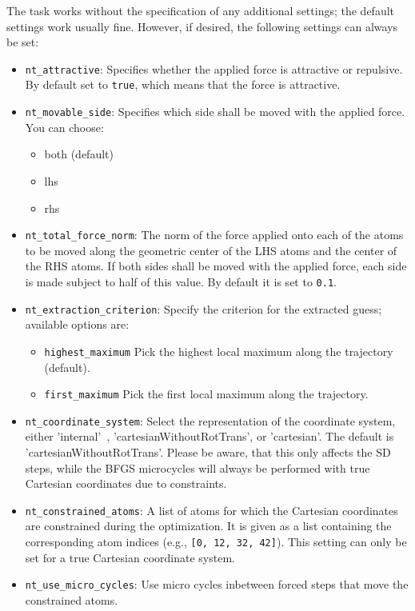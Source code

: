 \documentclass[]{tufte-book}
\begin{document}
The task works without the specification of any additional settings; the default settings work usually fine. However,
if desired, the following settings can always be set:
\begin{itemize}
\item \texttt{nt\_attractive}: Specifies whether the applied force is attractive or repulsive. By default set to
\texttt{true}, which means that the force is attractive.
\item \texttt{nt\_movable\_side}: Specifies which side shall be moved with the applied force. You can choose:
\begin{itemize}
\item both (default)
\item lhs
\item rhs
\end{itemize}
\item \texttt{nt\_total\_force\_norm}: The norm of the force applied onto each of the atoms to be moved along the geometric center of the LHS atoms and the center of the RHS atoms.
If both sides shall be moved with the applied force, each side is made subject to half of this value.
By default it is set to \texttt{0.1}.
\item \texttt{nt\_extraction\_criterion}: Specify the criterion for the extracted guess; available options are:
\begin{itemize}
  \item \texttt{highest\_maximum} Pick the highest local maximum along the trajectory (default).
  \item \texttt{first\_maximum} Pick the first local maximum along the trajectory.
\end{itemize}
\item \texttt{nt\_coordinate\_system}: Select the representation of the coordinate system, either
 'internal'~\cite{libirc}, 'cartesianWithoutRotTrans', or 'cartesian'. The default is 'cartesianWithoutRotTrans'.
Please be aware, that this only affects the SD steps, while the BFGS microcycles will always be performed with true
 Cartesian coordinates due to constraints.
\item \texttt{nt\_constrained\_atoms}: A list of atoms for which the Cartesian coordinates are constrained during the optimization.
  It is given as a list containing the corresponding atom indices (e.g., \texttt{[0, 12, 32, 42]}). This setting can only be set for a true Cartesian coordinate system.
\item \texttt{nt\_use\_micro\_cycles}: Use micro cycles inbetween forced steps that move the constrained atoms.

\end{itemize}
\end{document}
